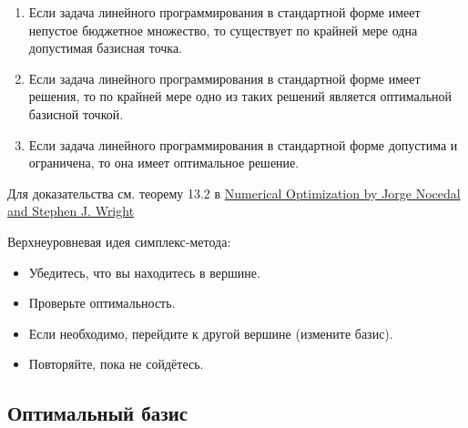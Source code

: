 \documentclass[
  russian,
  letterpaper,
  DIV=11,
  numbers=noendperiod]{scrartcl}
\providecommand{\tightlist}{%
  \setlength{\itemsep}{0pt}\setlength{\parskip}{0pt}}
\begin{document}
\begin{tcolorbox}[enhanced jigsaw, coltitle=black, arc=.35mm, titlerule=0mm, colbacktitle=quarto-callout-color!10!white, bottomrule=.15mm, bottomtitle=1mm, colback=white, opacitybacktitle=0.6, breakable, opacityback=0, colframe=quarto-callout-color-frame, toprule=.15mm, toptitle=1mm, rightrule=.15mm, title=\textcolor{quarto-callout-color}{\faInfo}\hspace{0.5em}{Theorem}, leftrule=.75mm, left=2mm]

\begin{enumerate}
\def\labelenumi{\arabic{enumi}.}
\tightlist
\item
  Если задача линейного программирования в стандартной форме имеет
  непустое бюджетное множество, то существует по крайней мере одна
  допустимая базисная точка.
\item
  Если задача линейного программирования в стандартной форме имеет
  решения, то по крайней мере одно из таких решений является оптимальной
  базисной точкой.
\item
  Если задача линейного программирования в стандартной форме допустима и
  ограничена, то она имеет оптимальное решение.
\end{enumerate}

Для доказательства см. теорему 13.2 в
\href{https://fmin.xyz/assets/files/NumericalOptimization.pdf}{Numerical
Optimization by Jorge Nocedal and Stephen J. Wright}

\end{tcolorbox}

Верхнеуровневая идея симплекс-метода:

\begin{itemize}
\tightlist
\item
  Убедитесь, что вы находитесь в вершине.
\item
  Проверьте оптимальность.
\end{itemize}

\begin{itemize}
\tightlist
\item
  Если необходимо, перейдите к другой вершине (измените базис).
\item
  Повторяйте, пока не сойдётесь.
\end{itemize}

\subsection{Оптимальный
базис}\label{ux43eux43fux442ux438ux43cux430ux43bux44cux43dux44bux439-ux431ux430ux437ux438ux441}
\end{document}
